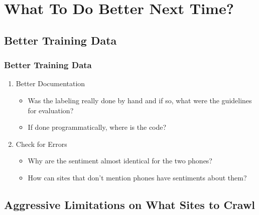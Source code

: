 \documentclass[10pt]{beamer}
\begin{document}
\section{What To Do Better Next Time?}



\subsection{Better Training Data}

\begin{frame}
\frametitle{Better Training Data}

\begin{enumerate}
    \item Better Documentation
    \begin{itemize}
        \item Was the labeling really done by hand and if so, what were
        the guidelines for evaluation?
        \item If done programmatically, where is the code?
    \end{itemize}
    \item Check for Errors
    \begin{itemize}
        \item Why are the sentiment almost identical for the two phones?
        \item How can sites that don't mention phones have sentiments about them?
    \end{itemize}
\end{enumerate}

\end{frame}

\subsection{Aggressive Limitations on What Sites to Crawl}
\end{document}
